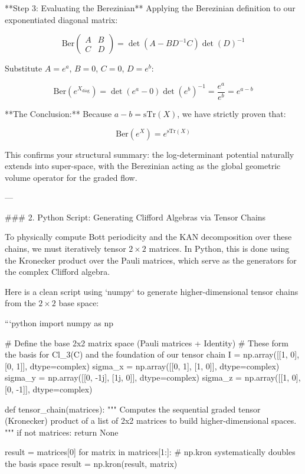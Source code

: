 **Step 3: Evaluating the Berezinian**
Applying the Berezinian definition to our exponentiated diagonal matrix:


$$\text{Ber}\begin{pmatrix} A & B \\ C & D \end{pmatrix} = \det(A - B D^{-1} C) \det(D)^{-1}$$

Substitute $A = e^a$, $B = 0$, $C = 0$, $D = e^b$:


$$\text{Ber}(e^{X_{\text{diag}}}) = \det(e^a - 0) \det(e^b)^{-1} = \frac{e^a}{e^b} = e^{a-b}$$

**The Conclusion:**
Because $a - b = \text{sTr}(X)$, we have strictly proven that:


$$\text{Ber}(e^X) = e^{\text{sTr}(X)}$$


This confirms your structural summary: the log-determinant potential naturally extends into super-space, with the Berezinian acting as the global geometric volume operator for the graded flow.

---

### 2. Python Script: Generating Clifford Algebras via Tensor Chains

To physically compute Bott periodicity and the KAN decomposition over these chains, we must iteratively tensor $2 \times 2$ matrices. In Python, this is done using the Kronecker product over the Pauli matrices, which serve as the generators for the complex Clifford algebra.

Here is a clean script using `numpy` to generate higher-dimensional tensor chains from the $2 \times 2$ base space:

```python
import numpy as np

# Define the base 2x2 matrix space (Pauli matrices + Identity)
# These form the basis for Cl_3(C) and the foundation of our tensor chain
I = np.array([[1, 0], [0, 1]], dtype=complex)
sigma_x = np.array([[0, 1], [1, 0]], dtype=complex)
sigma_y = np.array([[0, -1j], [1j, 0]], dtype=complex)
sigma_z = np.array([[1, 0], [0, -1]], dtype=complex)

def tensor_chain(matrices):
    """
    Computes the sequential graded tensor (Kronecker) product 
    of a list of 2x2 matrices to build higher-dimensional spaces.
    """
    if not matrices:
        return None
    
    result = matrices[0]
    for matrix in matrices[1:]:
        # np.kron systematically doubles the basis space
        result = np.kron(result, matrix)
        
